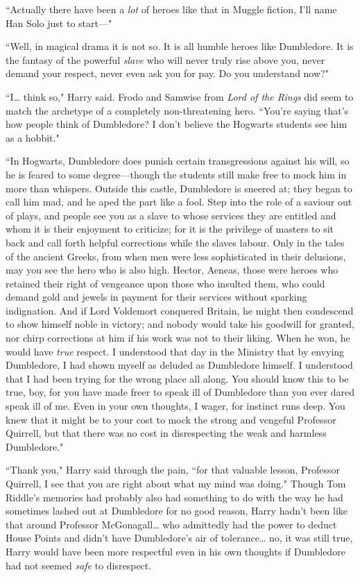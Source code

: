 ``Actually there have been a \emph{lot} of heroes like that in Muggle fiction, I'll name Han Solo just to start—"

``Well, in magical drama it is not so. It is all humble heroes like Dumbledore. It is the fantasy of the powerful \emph{slave} who will never truly rise above you, never demand your respect, never even ask you for pay. Do you understand now?"

``I{\ldots} think so," Harry said. Frodo and Samwise from \emph{Lord of the Rings} did seem to match the archetype of a completely non-threatening hero. ``You're saying that's how people think of Dumbledore? I don't believe the Hogwarts students see him as a hobbit."

``In Hogwarts, Dumbledore does punish certain transgressions against his will, so he is feared to some degree—though the students still make free to mock him in more than whispers. Outside this castle, Dumbledore is sneered at; they began to call him mad, and he aped the part like a fool. Step into the role of a saviour out of plays, and people see you as a slave to whose services they are entitled and whom it is their enjoyment to criticize; for it is the privilege of masters to sit back and call forth helpful corrections while the slaves labour. Only in the tales of the ancient Greeks, from when men were less sophisticated in their delusions, may you see the hero who is also high. Hector, Aeneas, those were heroes who retained their right of vengeance upon those who insulted them, who could demand gold and jewels in payment for their services without sparking indignation. And if Lord Voldemort conquered Britain, he might then condescend to show himself noble in victory; and nobody would take his goodwill for granted, nor chirp corrections at him if his work was not to their liking. When he won, he would have \emph{true} respect. I understood that day in the Ministry that by envying Dumbledore, I had shown myself as deluded as Dumbledore himself. I understood that I had been trying for the wrong place all along. You should know this to be true, boy, for you have made freer to speak ill of Dumbledore than you ever dared speak ill of me. Even in your own thoughts, I wager, for instinct runs deep. You knew that it might be to your cost to mock the strong and vengeful Professor Quirrell, but that there was no cost in disrespecting the weak and harmless Dumbledore."

``Thank you," Harry said through the pain, ``for that valuable lesson, Professor Quirrell, I see that you are right about what my mind was doing." Though Tom Riddle's memories had probably also had something to do with the way he had sometimes lashed out at Dumbledore for no good reason, Harry hadn't been like that around Professor McGonagall{\ldots} who admittedly had the power to deduct House Points and didn't have Dumbledore's air of tolerance{\ldots} no, it was still true, Harry would have been more respectful even in his own thoughts if Dumbledore had not seemed \emph{safe} to disrespect.

